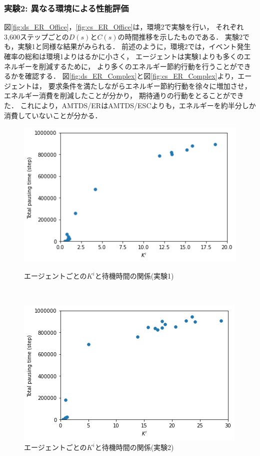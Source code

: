 \documentclass[12pt,a4j,twoside]{jarticle}
\begin{document}
  \subsubsection{実験2: 異なる環境による性能評価}\label{ex:ER2}
  図\ref{fig:ds_ER_Office}，\ref{fig:cs_ER_Office}は，環境2で実験を行い，
  それぞれ3,600ステップごとの$D(s)$と$C(s)$の時間推移を示したものである．
  実験2でも，実験1と同様な結果がみられる．
  前述のように，環境2では，イベント発生確率の総和は環境1よりはるかに小さく，
  エージェントは実験1よりも多くのエネルギーを削減するために，
  より多くのエネルギー節約行動を行うことができるかを確認する．
  図\ref{fig:ds_ER_Complex}と図\ref{fig:cs_ER_Complex}より，エージェントは，
  要求条件を満たしながらエネルギー節約行動を徐々に増加させ，エネルギー消費を削減したことが分かり，
  期待通りの行動をとることができた．
  これにより，AMTDS/ERはAMTDS/ESCよりも，エネルギーを約半分しか消費していないことが分かる．


  \begin{figure}
    \begin{minipage}{1.0\columnwidth}
      \centering
      \includegraphics[width=0.8\hsize]{figures/CorrectionScatter_Office_ER.png}
      \caption{エージェントごとの$K^i$と待機時間の関係(実験1)}
      \label{fig:cscatter_ER_Office}
    \end{minipage}
    \\[40pt]
    \begin{minipage}{1.0\columnwidth}
      \centering
      \includegraphics[width=0.8\hsize]{figures/CorrectionScatter_Complex_ER.png}
      \caption{エージェントごとの$K^i$と待機時間の関係(実験2)}
      \label{fig:cscatter_ER_Complex}
    \end{minipage}
  \end{figure}
\end{document}
